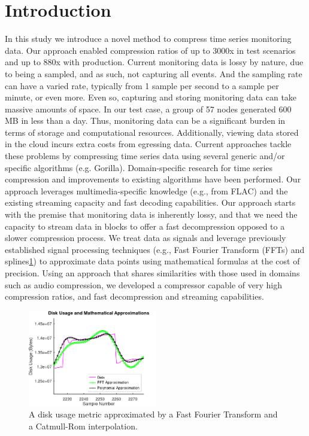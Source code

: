\documentclass[conference]{IEEEtran}
\begin{document}
\section{Introduction}
In this study we introduce a novel method to compress time series monitoring data\cite{influx}. 
Our approach enabled compression ratios of up to 3000x in test scenarios and up to 880x with production.
Current monitoring data is lossy by nature, due to being a sampled, and as such, not capturing all events. And the sampling rate can have a varied rate, typically from 1 sample per second to a sample per minute\cite{monitoring-samples}, or even more\cite{microsoft}.  
Even so, capturing and storing monitoring data can take massive amounts of space. In our test case, a group of 57 nodes generated 600 MB in less than a day.
Thus, monitoring data can be a significant burden in terms of storage and computational resources. Additionally, viewing data stored in the cloud incurs extra costs from egressing data.
Current approaches tackle these problems by compressing time series data using several generic and/or specific algorithms\cite{timescale}\cite{dzone}\cite{compression} (e.g. Gorilla\cite{gorilla}).
Domain-specific research for time series compression\cite{nasa-compression}\cite{smartgrid} and improvements to existing algorithms\cite{victoria} have been performed.
Our approach leverages multimedia-specific knowledge (e.g., from FLAC\cite{flac}) and the existing streaming capacity and fast decoding capabilities.
Our approach starts with the premise that monitoring data is inherently lossy, and that we need the capacity to stream data in blocks to offer a fast decompression opposed to a slower compression process.
We treat data as signals and leverage previously established signal processing techniques (e.g., Fast Fourier Transform (FFTs) and splines\ref{math_aprox}) to approximate data points using mathematical formulas at the cost of precision.
Using an approach that shares similarities with those used in domains such as audio compression, we developed a compressor capable of very high compression ratios, and fast decompression and streaming capabilities.

\begin{figure}[ht]
  \centering
  \includegraphics[width=0.5\textwidth]{math_approximation-4.png}
  \caption{A disk usage metric approximated by a Fast Fourier Transform and a Catmull-Rom interpolation.}
  \label{math_aprox}
\end{figure}
\end{document}
